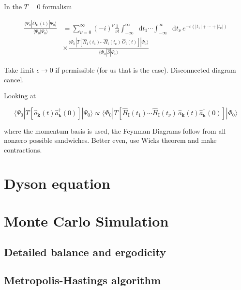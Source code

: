 \documentclass[12pt]{report}
\renewcommand{\vec}[1]{\boldsymbol{\mathbf{#1}}}                        %
\newcommand*\diff{\mathop{}\!\mathrm{d}}
\begin{document}
In the $ T = 0 $ formalism

\begin{equation}
	\begin{split}
		\frac{\langle \Psi_0 |  \hat O_\text{H}(t)  | \Psi_0 \rangle}{\langle \Psi_0  | \Psi_0 \rangle}
		&=
		\sum_{\nu = 0}^\infty \left( - i \right)^\nu \frac{1}{\nu !}
		\int_{-\infty}^{\infty} \diff t_1 \cdots \int_{-\infty}^{\infty} \diff t_\nu
		\, e^{- \epsilon \left( |t_1| + \cdots + |t_\nu| \right)} \\[1em]
		&\times \frac{\langle \Phi_0  | T[\hat H_\text{I} (t_1) \cdots \hat H_\text{I} (t_\nu) \, \hat O_\text{I}(t)] | \Phi_0 \rangle}{\langle \Phi_0  | \hat S |\Phi_0 \rangle}
	\end{split}
\end{equation}

Take limit $ \epsilon \rightarrow 0 $ if permissible (for us that is the case). Disconnected diagram cancel.

Looking at

\begin{equation}
	\langle \Psi_0 |  T[\hat a_{\vec k}(t) \hat a^\dagger_{\vec k}(0)]  | \Psi_0 \rangle
	\propto
	\langle \Phi_0  | T[\hat H_\text{I} (t_1) \cdots \hat H_\text{I} (t_\nu) \, \hat a_{\vec k}(t) \hat a^\dagger_{\vec k}(0)] | \Phi_0 \rangle
\end{equation}

where the momentum basis is used, the Feynman Diagrams follow from all nonzero possible sandwiches. Better even, use Wicks theorem and make contractions.




\section{Dyson equation}



\section{Monte Carlo Simulation}

\subsection{Detailed balance and ergodicity}

\subsection{Metropolis-Hastings algorithm}
\end{document}
